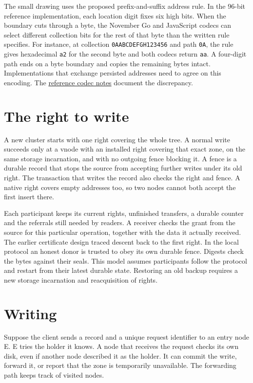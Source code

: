 \documentclass[11pt]{article}
\begin{document}
The small drawing uses the proposed prefix-and-suffix address rule. In the 96-bit reference implementation, each location digit fixes six high bits. When the boundary cuts through a byte, the November Go and JavaScript codecs can select different collection bits for the rest of that byte than the written rule specifies. For instance, at collection \texttt{0AABCDEFGH123456} and path \texttt{0A}, the rule gives hexadecimal \texttt{a2} for the second byte and both codecs return \texttt{aa}. A four-digit path ends on a byte boundary and copies the remaining bytes intact. Implementations that exchange persisted addresses need to agree on this encoding. The \href{https://github.com/indexus/core/blob/e4b9072/docs/protocol/component-boundaries.md}{reference codec notes} document the discrepancy.

\section{The right to write}\hypertarget{ix:authority}{}
A new cluster starts with one right covering the whole tree. A normal write succeeds only at a vnode with an installed right covering that exact zone, on the same storage incarnation, and with no outgoing fence blocking it. A fence is a durable record that stops the source from accepting further writes under its old right. The transaction that writes the record also checks the right and fence. A native right covers empty addresses too, so two nodes cannot both accept the first insert there.

Each participant keeps its current rights, unfinished transfers, a durable counter and the referrals still needed by readers. A receiver checks the grant from the source for this particular operation, together with the data it actually received. The earlier certificate design traced descent back to the first right. In the local protocol an honest donor is trusted to obey its own durable fence. Digests check the bytes against their seals. This model assumes participants follow the protocol and restart from their latest durable state. Restoring an old backup requires a new storage incarnation and reacquisition of rights.

\section{Writing}\hypertarget{ix:writes}{}
Suppose the client sends a record and a unique request identifier to an entry node E. E tries the holder it knows. A node that receives the request checks its own disk, even if another node described it as the holder. It can commit the write, forward it, or report that the zone is temporarily unavailable. The forwarding path keeps track of visited nodes.
\end{document}
